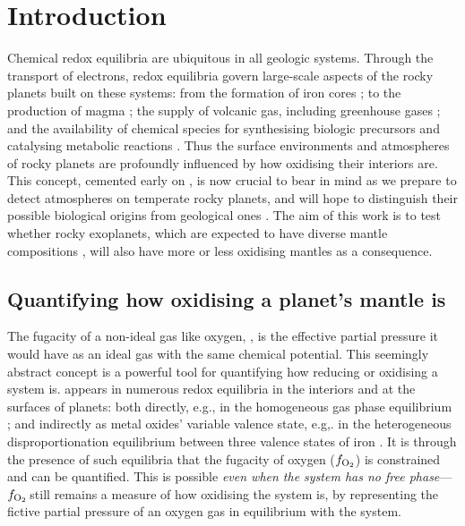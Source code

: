 \documentclass[fleqn,usenatbib,twocolumn]{mnras}
\newcommand{\fo}{$f_{\ce{O2}}$}
\begin{document}
\section{Introduction}

Chemical redox equilibria are ubiquitous in all geologic systems. Through the transport of electrons, redox equilibria govern large-scale aspects of the rocky planets built on these systems: from the formation of iron cores \citep{wood_accretion_2006, elkins-tanton_coreless_2008, rubie_accretion_2015, lichtenberg_redox_2021}; to the production of magma \citep[e.g.,][]{holloway_high-pressure_1992, foley_reappraisal_2011, stagno_oxidation_2013, lin_oxygen_2021}; the supply of volcanic gas, including greenhouse gases \citep[e.g.,][]{kasting_mantle_1993, delano_redox_2001, gaillard_theoretical_2014, ortenzi_mantle_2020, guimond_low_2021,liggins_growth_2022}; and the availability of chemical species for synthesising biologic precursors and catalysing metabolic reactions \citep[e.g.,][]{muchowska_synthesis_2019, wade_temporal_2021}. Thus the surface environments and atmospheres of rocky planets are profoundly influenced by how oxidising their interiors are. This concept, cemented early on \citep{kasting_mantle_1993, holland_volcanic_2002, kasting_evolution_2003}, is now crucial to bear in mind as we prepare to detect atmospheres on temperate rocky planets, and will hope to distinguish their possible biological origins from geological ones \citep{wordsworth_redox_2018, wogan_abundant_2020, krissansen-totton_oxygen_2021, krissansen-totton_understanding_2022}. The aim of this work is to test whether rocky exoplanets, which are expected to have diverse mantle compositions \citep{hinkel_starplanet_2018, putirka_composition_2019, guimond_mantle_2023, spaargaren_plausible_2022}, will also have more or less oxidising mantles as a consequence. 


\subsection{Quantifying how oxidising a planet's mantle is}\label{sec:quantifying-how-oxidising}

The fugacity of a non-ideal gas like oxygen, , is the effective partial pressure it would have as an ideal gas with the same chemical potential. This seemingly abstract concept is a powerful tool for quantifying how reducing or oxidising a system is.  appears in numerous redox equilibria in the interiors and at the surfaces of planets: both directly, e.g., in the homogeneous gas phase equilibrium ; and indirectly as metal oxides' variable valence state, e.g,. in the heterogeneous disproportionation equilibrium  between three valence states of iron \citep{frost_redox_2008}.  It is through the presence of such equilibria that the fugacity of oxygen (\fo) is constrained and can be quantified. This is possible \emph{even when the system has no free  phase}---\fo\,still remains a measure of how oxidising the system is, by representing the fictive partial pressure of an oxygen gas in equilibrium with the system. 
\end{document}
